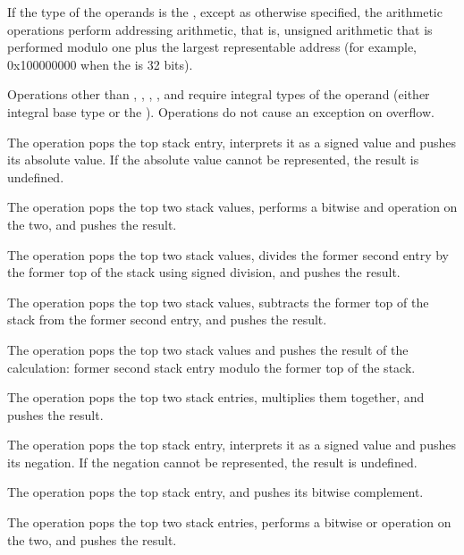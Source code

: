 If the type of the operands is the \specialaddresstype, 
except as otherwise specified, the arithmetic operations
perform addressing arithmetic, that is, unsigned arithmetic that is performed
modulo one plus the largest representable address (for example, 0x100000000
when the  is 32 bits). 

Operations other than \DWOPabs{},
\DWOPdiv{}, \DWOPminus{}, \DWOPmul{}, \DWOPneg{} and \DWOPplus{} 
require integral types of the operand (either integral base type 
or the \specialaddresstype).  Operations do not cause an exception 
on overflow.

\begin{enumerate}[1. ]
\itembfnl{\DWOPabsTARG}
The \DWOPabsNAME{} operation pops the top stack entry, interprets
it as a signed value and pushes its absolute value. If the
absolute value cannot be represented, the result is undefined.

\itembfnl{\DWOPandTARG}
The \DWOPandNAME{} operation pops the top two stack values, performs
a bitwise and operation on the two, and pushes the result.

\itembfnl{\DWOPdivTARG}
The \DWOPdivNAME{} operation pops the top two stack values, divides the former second entry by
the former top of the stack using signed division, and pushes the result.

\itembfnl{\DWOPminusTARG}
The \DWOPminusNAME{} operation pops the top two stack values, subtracts the former top of the
stack from the former second entry, and pushes the result.

\itembfnl{\DWOPmodTARG}
The \DWOPmodNAME{} operation pops the top two stack values and pushes the result of the
calculation: former second stack entry modulo the former top of the stack.

\itembfnl{\DWOPmulTARG}
The \DWOPmulNAME{} operation pops the top two stack entries, multiplies them together, and
pushes the result.

\itembfnl{\DWOPnegTARG}
The \DWOPnegNAME{} operation pops the top stack entry, interprets
it as a signed value and pushes its negation. If the negation
cannot be represented, the result is undefined.

\itembfnl{\DWOPnotTARG}
The \DWOPnotNAME{} operation pops the top stack entry, and pushes
its bitwise complement.

\itembfnl{\DWOPorTARG}
The \DWOPorNAME{} operation pops the top two stack entries, performs
a bitwise or operation on the two, and pushes the result.


\end{enumerate}
